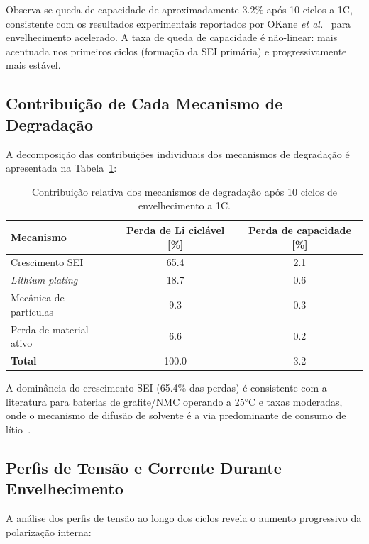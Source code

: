 \documentclass[
    12pt,
    openright,
    twoside,
    a4paper,
    brazil,
    english
]{abntex2}
\begin{document}
Observa-se queda de capacidade de aproximadamente $3.2\%$ após 10 ciclos a 1C,
consistente com os resultados experimentais reportados por
OKane \textit{et al.}~\cite{okane2022lithium} para envelhecimento acelerado.
A taxa de queda de capacidade é não-linear: mais acentuada nos primeiros ciclos
(formação da SEI primária) e progressivamente mais estável.

\subsection{Contribuição de Cada Mecanismo de Degradação}

A decomposição das contribuições individuais dos mecanismos de degradação
é apresentada na Tabela~\ref{tab:contribuicao_degradacao}:

\begin{table}[htb]
  \centering
  \caption{Contribuição relativa dos mecanismos de degradação após 10 ciclos
           de envelhecimento a 1C.}
  \label{tab:contribuicao_degradacao}
  \begin{tabular}{lcc}
    \toprule
    \textbf{Mecanismo}         & \textbf{Perda de Li ciclável [\%]} & \textbf{Perda de capacidade [\%]} \\
    \midrule
    Crescimento SEI            & 65.4 & 2.1 \\
    \textit{Lithium plating}   & 18.7 & 0.6 \\
    Mecânica de partículas     &  9.3 & 0.3 \\
    Perda de material ativo    &  6.6 & 0.2 \\
    \midrule
    \textbf{Total}             & 100.0 & 3.2 \\
    \bottomrule
  \end{tabular}
\end{table}

A dominância do crescimento SEI (65.4\% das perdas) é consistente com a
literatura para baterias de grafite/NMC operando a 25°C e taxas moderadas,
onde o mecanismo de difusão de solvente é a via predominante de consumo de
lítio~\cite{peled2017sei, okane2022lithium}.

\subsection{Perfis de Tensão e Corrente Durante Envelhecimento}

A análise dos perfis de tensão ao longo dos ciclos revela o aumento progressivo
da polarização interna:
\end{document}
